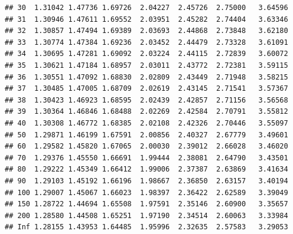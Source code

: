 \documentclass[onecolumn,12pt]{book}\usepackage[]{graphicx}\usepackage[]{color}
\makeatletter
\newenvironment{kframe}{%
 \def\at@end@of@kframe{}%
 \ifinner\ifhmode%
  \def\at@end@of@kframe{\end{minipage}}%
  \begin{minipage}{\columnwidth}%
 \fi\fi%
 \def\FrameCommand##1{\hskip\@totalleftmargin \hskip-\fboxsep
 \colorbox{shadecolor}{##1}\hskip-\fboxsep
     \hskip-\linewidth \hskip-\@totalleftmargin \hskip\columnwidth}%
 \MakeFramed {\advance\hsize-\width
   \@totalleftmargin\z@ \linewidth\hsize
   \@setminipage}}%
 {\par\unskip\endMakeFramed%
 \at@end@of@kframe}
\newenvironment{knitrout}{}{} %
\makeatother
\begin{document}
\begin{knitrout}
\begin{kframe}
\begin{verbatim}
## 30  1.31042 1.47736 1.69726  2.04227  2.45726  2.75000   3.64596
## 31  1.30946 1.47611 1.69552  2.03951  2.45282  2.74404   3.63346
## 32  1.30857 1.47494 1.69389  2.03693  2.44868  2.73848   3.62180
## 33  1.30774 1.47384 1.69236  2.03452  2.44479  2.73328   3.61091
## 34  1.30695 1.47281 1.69092  2.03224  2.44115  2.72839   3.60072
## 35  1.30621 1.47184 1.68957  2.03011  2.43772  2.72381   3.59115
## 36  1.30551 1.47092 1.68830  2.02809  2.43449  2.71948   3.58215
## 37  1.30485 1.47005 1.68709  2.02619  2.43145  2.71541   3.57367
## 38  1.30423 1.46923 1.68595  2.02439  2.42857  2.71156   3.56568
## 39  1.30364 1.46846 1.68488  2.02269  2.42584  2.70791   3.55812
## 40  1.30308 1.46772 1.68385  2.02108  2.42326  2.70446   3.55097
## 50  1.29871 1.46199 1.67591  2.00856  2.40327  2.67779   3.49601
## 60  1.29582 1.45820 1.67065  2.00030  2.39012  2.66028   3.46020
## 70  1.29376 1.45550 1.66691  1.99444  2.38081  2.64790   3.43501
## 80  1.29222 1.45349 1.66412  1.99006  2.37387  2.63869   3.41634
## 90  1.29103 1.45192 1.66196  1.98667  2.36850  2.63157   3.40194
## 100 1.29007 1.45067 1.66023  1.98397  2.36422  2.62589   3.39049
## 150 1.28722 1.44694 1.65508  1.97591  2.35146  2.60900   3.35657
## 200 1.28580 1.44508 1.65251  1.97190  2.34514  2.60063   3.33984
## Inf 1.28155 1.43953 1.64485  1.95996  2.32635  2.57583   3.29053
\end{verbatim}
\end{kframe}
\end{knitrout}
  \normalsize
\end{document}
